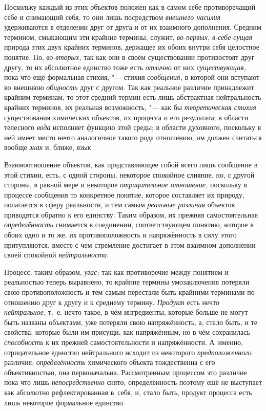 Поскольку каждый из этих объектов положен как в самом себе
противоречащий себе и снимающий себя, то они лишь посредством
{\em внешнего насилия}
удерживаются в отделении друг от друга и от их
взаимного дополнения. Средним термином, смыкающим эти
крайние термины, служит,
{\em во-первых,}
{\em в-себе-сущая} природа
этих двух крайних терминов, держащее их обоих внутри себя целостное
понятие. Но, {\em во-вторых,}
так как они в своём существовании противостоят друг другу, то
их абсолютное единство тоже есть
{\em отлично} от них
{\em существующая,} пока
что ещё формальная стихия, "--- стихия
{\em сообщения,} в
которой они вступают во внешнюю
{\em общность} друг с
другом. Так как реальное различие принадлежит крайним терминам, то этот
средний термин есть лишь абстрактная нейтральность крайних терминов, их
реальная возможность, "--- как бы
{\em теоретическая стихия}
существования химических объектов, их процесса и его
результата; в области телесного
{\em вода} исполняет
функцию этой среды; в области духовного, поскольку в ней имеет место нечто
аналогичное такого рода отношению, им должен считаться вообще
{\em знак} и, ближе,
{\em язык}.

Взаимоотношение объектов, как представляющее собой всего лишь
сообщение в этой стихии, есть, с одной стороны, некоторое спокойное
слияние, но, с другой стороны, в равной мере и некоторое
{\em отрицательное отношение,}
поскольку в процессе сообщения то конкретное понятие, которое
составляет их природу, полагается в сферу реальности, и тем самым
{\em реальные различия}
объектов приводятся обратно к его единству. Таким образом, их
прежняя самостоятельная
{\em определённость}
снимается в соединении, соответствующем понятию, которое в
обоих одно и то же, их противоположность и напряжённость в силу этого
притупляются, вместе с чем стремление достигает в этом взаимном дополнении
своей спокойной {\em нейтральности}.

Процесс, таким образом,
{\em угас;} так как
противоречие между понятием и реальностью теперь выравнено, то крайние
термины умозаключения потеряли свою противоположность и тем самым перестали
быть крайними терминами по отношению друг к другу и к среднему термину.
{\em Продукт} есть нечто
{\em нейтральное,} т.~е.
нечто такое, в чём ингредиенты, которые больше не могут быть названы
объектами, уже потеряли свою напряжённость, а, стало быть, и те свойства,
которые были им присущи, как напряжённым, но в чём сохранилась
{\em способность} к их
прежней самостоятельности и напряжённости. А~именно, отрицательное единство
нейтрального исходит из некоторого
{\em предположенного}
различия;
{\em определённость}
химического объекта тождественна с его объективностью, она
первоначальна. Рассмотренным процессом это различие пока что лишь
{\em непосредственно}
снято; определённость поэтому ещё не выступает
как абсолютно рефлектированная в~себя, и, стало быть, продукт процесса есть
лишь некоторое формальное единство.

